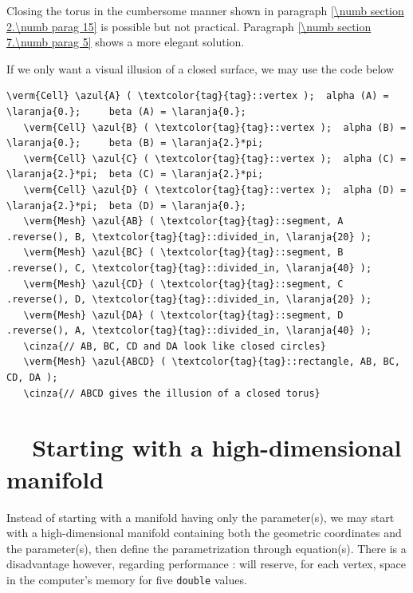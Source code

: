 Closing the torus in the cumbersome manner shown in paragraph
\ref{\numb section 2.\numb parag 15} is possible but not practical.
Paragraph \ref{\numb section 7.\numb parag 5} shows a more elegant solution.

If we only want a visual illusion of a closed surface, we may use the code below

\begin{Verbatim}[commandchars=\\\{\},formatcom=\small\tt,baselinestretch=0.94]
   \verm{Cell} \azul{A} ( \textcolor{tag}{tag}::vertex );  alpha (A) = \laranja{0.};     beta (A) = \laranja{0.};
   \verm{Cell} \azul{B} ( \textcolor{tag}{tag}::vertex );  alpha (B) = \laranja{0.};     beta (B) = \laranja{2.}*pi;
   \verm{Cell} \azul{C} ( \textcolor{tag}{tag}::vertex );  alpha (C) = \laranja{2.}*pi;  beta (C) = \laranja{2.}*pi;
   \verm{Cell} \azul{D} ( \textcolor{tag}{tag}::vertex );  alpha (D) = \laranja{2.}*pi;  beta (D) = \laranja{0.};
   \verm{Mesh} \azul{AB} ( \textcolor{tag}{tag}::segment, A .reverse(), B, \textcolor{tag}{tag}::divided_in, \laranja{20} );
   \verm{Mesh} \azul{BC} ( \textcolor{tag}{tag}::segment, B .reverse(), C, \textcolor{tag}{tag}::divided_in, \laranja{40} );
   \verm{Mesh} \azul{CD} ( \textcolor{tag}{tag}::segment, C .reverse(), D, \textcolor{tag}{tag}::divided_in, \laranja{20} );
   \verm{Mesh} \azul{DA} ( \textcolor{tag}{tag}::segment, D .reverse(), A, \textcolor{tag}{tag}::divided_in, \laranja{40} );
   \cinza{// AB, BC, CD and DA look like closed circles}
   \verm{Mesh} \azul{ABCD} ( \textcolor{tag}{tag}::rectangle, AB, BC, CD, DA );
   \cinza{// ABCD gives the illusion of a closed torus}
\end{Verbatim}


\section{~~Starting with a high-dimensional manifold}\label{\numb section 2.\numb parag 17}

Instead of starting with a manifold having only the parameter(s), we may start with a
high-dimensional manifold containing both the geometric coordinates and the parameter(s),
then define the parametrization through equation(s).
There is a disadvantage however, regarding performance : {\maniFEM} will reserve,
for each vertex, space in the computer's memory for five {\small\tt double} values.

